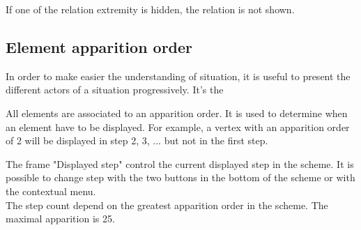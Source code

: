 If one of the relation extremity is hidden, the relation is not shown. \\



\subsection{Element apparition order}

In order to make easier the understanding of situation, it is useful to present the different actors of a situation progressively. It's the 

All elements are associated to an apparition order. It is used to determine when an element have to be displayed. For example, a vertex with an apparition order of 2 will be displayed in step 2, 3, ... but not in the first step. 

The frame "Displayed step" control the current displayed step in the scheme. It is possible to change step with the two buttons in the bottom of the scheme or with the contextual menu.\\


The step count depend on the greatest apparition order in the scheme. The maximal apparition is 25.\\

